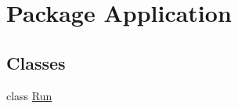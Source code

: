 \hypertarget{namespace_application}{}\section{Package Application}
\label{namespace_application}
\subsection*{Classes}
\begin{DoxyCompactItemize}
\item 
class \hyperlink{class_application_1_1_run}{Run}
\end{DoxyCompactItemize}
